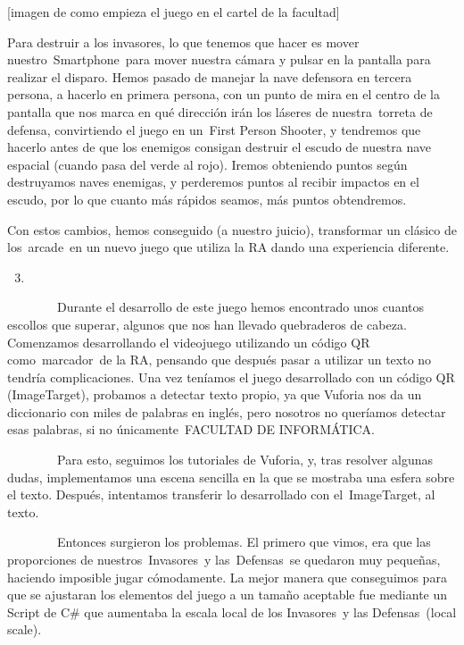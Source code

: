\documentclass[]{article}
\begin{document}
{[}imagen de como empieza el juego en el cartel de la facultad{]}

Para destruir a los invasores, lo que tenemos que hacer es mover
nuestro~Smartphone~para mover nuestra cámara y pulsar en la pantalla
para realizar el disparo. Hemos pasado de manejar la nave defensora en
tercera persona, a hacerlo en primera persona, con un punto de mira en
el centro de la pantalla que nos marca en qué dirección irán los láseres
de nuestra~torreta de defensa, convirtiendo el juego en un~First Person
Shooter, y tendremos que hacerlo antes de que los enemigos consigan
destruir el escudo de nuestra nave espacial (cuando pasa del verde al
rojo). Iremos obteniendo puntos según destruyamos naves enemigas, y
perderemos puntos al recibir impactos en el escudo, por lo que cuanto
más rápidos seamos, más puntos obtendremos.

Con estos cambios, hemos conseguido (a nuestro juicio), transformar un
clásico de los~arcade~en un nuevo juego que utiliza la RA dando una
experiencia diferente.

\begin{enumerate}
\setcounter{enumi}{2}
\item
\end{enumerate}

~~~~~~~~Durante el desarrollo de este juego hemos encontrado unos
cuantos escollos que superar, algunos que nos han llevado quebraderos de
cabeza. Comenzamos desarrollando el videojuego utilizando un código QR
como~marcador~de la RA, pensando que después pasar a utilizar un texto
no tendría complicaciones. Una vez teníamos el juego desarrollado con un
código QR (ImageTarget), probamos a detectar texto propio, ya que
Vuforia nos da un diccionario con miles de palabras en inglés, pero
nosotros no queríamos detectar esas palabras, si no únicamente~FACULTAD
DE INFORMÁTICA.

~~~~~~~~Para esto, seguimos los tutoriales de Vuforia, y, tras resolver
algunas dudas, implementamos una escena sencilla en la que se mostraba
una esfera sobre el texto. Después, intentamos transferir lo
desarrollado con el~ImageTarget, al texto.

~~~~~~~~Entonces surgieron los problemas. El primero que vimos, era que
las proporciones de nuestros~Invasores~y las~Defensas~se quedaron muy
pequeñas, haciendo imposible jugar cómodamente. La mejor manera que
conseguimos para que se ajustaran los elementos del juego a un tamaño
aceptable fue mediante un Script de C\# que aumentaba la escala local de
los Invasores~y las Defensas~(local scale).
\end{document}
